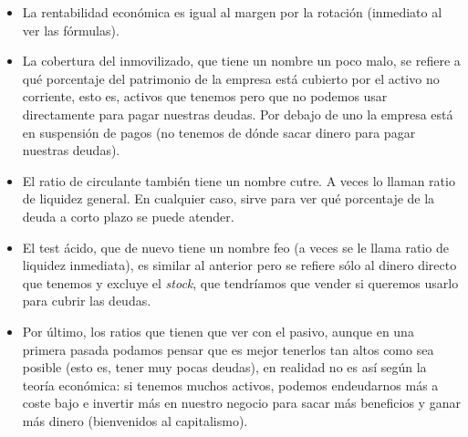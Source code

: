 \documentclass[nochap,palatino,notitlepage]{apuntes}
\begin{document}
\begin{itemize}
\item La rentabilidad económica es igual al margen por la rotación (inmediato al ver las fórmulas).
\item La cobertura del inmovilizado, que tiene un nombre un poco malo, se refiere a qué porcentaje del patrimonio de la empresa está cubierto por el activo no corriente, esto es, activos que tenemos pero que no podemos usar directamente para pagar nuestras deudas. Por debajo de uno la empresa está en suspensión de pagos (no tenemos de dónde sacar dinero para pagar nuestras deudas).
\item El ratio de circulante también tiene un nombre cutre. A veces lo llaman ratio de liquidez general. En cualquier caso, sirve para ver qué porcentaje de la deuda a corto plazo se puede atender.
\item El test ácido, que de nuevo tiene un nombre feo (a veces se le llama ratio de liquidez inmediata), es similar al anterior pero se refiere sólo al dinero directo que tenemos y excluye el \textit{stock}, que tendríamos que vender si queremos usarlo para cubrir las deudas.
\item Por último, los ratios que tienen que ver con el pasivo, aunque en una primera pasada podamos pensar que es mejor tenerlos tan altos como sea posible (esto es, tener muy pocas deudas), en realidad no es así según la teoría económica: si tenemos muchos activos, podemos endeudarnos más a coste bajo e invertir más en nuestro negocio para sacar más beneficios y ganar más dinero (bienvenidos al capitalismo).
\end{itemize}
\end{document}

